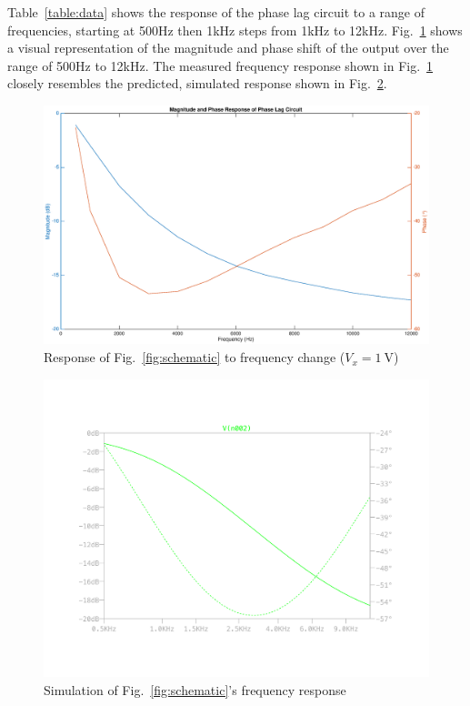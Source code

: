 Table~\ref{table:data} shows the response of the phase lag circuit to a range of frequencies, starting at 500\si{\hertz} then 1\si{\kilo\hertz} steps from 1\si{\kilo\hertz} to 12\si{\kilo\hertz}.
Fig.~\ref{fig:response} shows a visual representation of the magnitude and phase shift of the output over the range of 500\si{\hertz} to 12\si{\kilo\hertz}.
The measured frequency response shown in Fig.~\ref{fig:response} closely resembles the predicted, simulated response shown in Fig.~\ref{fig:response-sim}.

\begin{figure}[tbph]
	\centering
	\includegraphics[width=0.8\linewidth]{graphics/response}
	\caption{Response of Fig.~\ref{fig:schematic} to frequency change ($V_x = \SI{1}{\volt}$)}
	\label{fig:response}
\end{figure}

\begin{figure}[tbph]
	\centering
	\includegraphics[width=0.8\linewidth]{graphics/response-sim}
	\caption{Simulation of Fig.~\ref{fig:schematic}'s frequency response}
	\label{fig:response-sim}
\end{figure}

